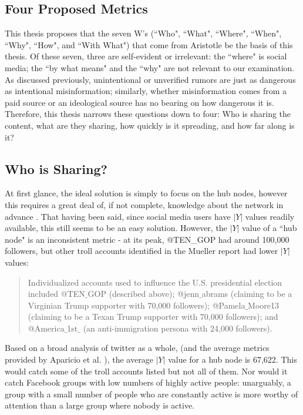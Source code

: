 \documentclass[preprint,review,12pt]{elsarticle}
\begin{document}
\subsection{Four Proposed Metrics}
This thesis proposes that the seven W's (``Who", ``What", ``Where", ``When", ``Why", ``How", and ``With What") that come from Aristotle \cite{sloan2010aristotle,aquinas1952thomas} be the basis of this thesis. Of these seven, three are self-evident or irrelevant: the ``where" is social media; the ``by what means" and the ``why" are not relevant to our examination. As discussed previously, unintentional or unverified rumors are just as dangerous as intentional misinformation; similarly, whether misinformation comes from a paid source or an ideological source has no bearing on how dangerous it is. Therefore, this thesis narrows these questions down to four: Who is sharing the content, what are they sharing, how quickly is it spreading, and how far along is it?

\subsection{Who is Sharing?}
At first glance, the ideal solution is simply to focus on the hub nodes, however this requires a great deal of, if not complete, knowledge about the network in advance  \cite{dezsHo2002halting,pastor2002immunization}. That having been said, since social media users have $|Y|$ values readily available, this still seems to be an easy solution. However, the $|Y|$ value of a ``hub node" is an inconsistent metric - at its peak, @TEN\_GOP had around 100,000 followers, but other troll accounts identified in the Mueller report had lower $|Y|$ values:

\begin{quote}
Individualized accounts used to influence the U.S. presidential election included @TEN$\_$GOP (described above); @jenn$\_$abrams (claiming to be a Virginian Trump supporter with 70,000 followers); @Pamela$\_$Moore13 (claiming to be a Texan Trump supporter with 70,000
followers); and @America$\_$1st$\_$ (an anti-immigration persona with 24,000 followers). \cite{mueller2019mueller}
\end{quote}

Based on a broad analysis of twitter as a whole, (and the average metrics provided by Aparicio et al. \cite{aparicio2015model}), the average $|Y|$ value for a hub node is 67,622. This would catch some of the troll accounts listed but not all of them. Nor would it catch Facebook groups with low numbers of highly active people: unarguably, a group with a small number of people who are constantly active is more worthy of attention than a large group where nobody is active.
\end{document}
